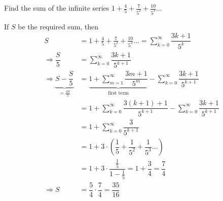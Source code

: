 
%
%
%
%
% 
% 

\question[4] Find the sum of the infinite series $1 + \frac{4}{5} + \frac{7}{5^2} + \frac{10}{5^3}\ldots$


\ifprintanswers
\fi 

\begin{solution}[\halfpage]
	If $S$ be the required sum, then
	\begin{align}
		S &= 1 + \frac{4}{5} + \frac{7}{5^2} + \frac{10}{5^3}\ldots = \sum_{k=0}^{\infty}\dfrac{3k+1}{5^k} \\
		\Rightarrow\dfrac{S}{5} &= \sum_{k=0}^{\infty}\dfrac{3k+1}{5^{k+1}} \\
		\Rightarrow \underbrace{S - \dfrac{S}{5}}_{= \frac{4S}{5}} &= \underbrace{1 + \sum_{m=1}^{\infty}\dfrac{3m+1}{5^m}}
		_{\text{first term}}- \sum_{k=0}^{\infty}\dfrac{3k+1}{5^{k+1}} \\
		&= 1 + \sum_{k=0}^{\infty}\dfrac{3(k+1)+1}{5^{k+1}}-\sum_{k=0}^{\infty}\dfrac{3k+1}{5^{k+1}} \\
		&= 1 + \sum_{k=0}^{\infty}\dfrac{3}{5^{k+1}} \\
		&= 1 + 3\cdot\left( \dfrac{1}{5} + \dfrac{1}{5^2} + \dfrac{1}{5^3}\ldots \right) \\
		&= 1 + 3\cdot\dfrac{\frac{1}{5}}{1-\frac{1}{5}} = 1 + \dfrac{3}{4} = \dfrac{7}{4} \\
		\Rightarrow S &= \dfrac{5}{4}\cdot\dfrac{7}{4} = \dfrac{35}{16}
	\end{align}
\end{solution}

